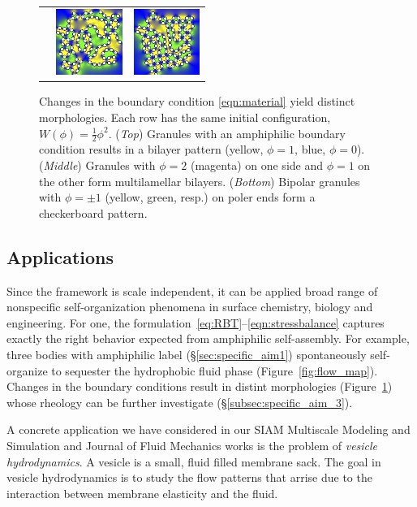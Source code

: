 \begin{figure}
\begin{center}
\begin{tabular}{m{0.9in}m{0.9in}m{0.9in}}
      &\includegraphics[width=0.85in]{figures/SpecificAim1/N100A2.jpg}
      &\includegraphics[width=0.85in]{figures/SpecificAim1/N100A3.jpg} 
  \end{tabular}
  \end{center}
  \vspace{-15pt}
  \caption{\footnotesize \label{fig:self-assembly2}
  Changes in the boundary condition \eqref{eqn:material}
  yield distinct morphologies.
  Each row has the same initial configuration, $W(\phi) = \tfrac{1}{2}\phi^2$.
  (\emph{Top}) Granules with an amphiphilic boundary condition
  results in a bilayer pattern (yellow,
  $\phi = 1$, blue, $\phi = 0$).
  (\emph{Middle}) Granules with $\phi = 2$ (magenta) on one side and $\phi = 1$
  on the other   form multilamellar bilayers.
  (\emph{Bottom}) Bipolar granules with $\phi = \pm 1$ (yellow, green, resp.)
  on poler ends   form a checkerboard pattern.}
\end{figure}
\subsection{Applications}
Since the framework is scale independent, it can be applied broad
range of nonspecific self-organization phenomena in surface chemistry,
biology and engineering. For one, the
formulation~\eqref{eq:RBT}--\eqref{eqn:stressbalance} captures exactly
the right behavior expected from amphiphilic self-assembly.
For example, three bodies with amphiphilic label (\S\ref{sec:specific_aim1})
spontaneously self-organize to sequester the hydrophobic fluid phase
(Figure~\ref{fig:flow_map}).
Changes in the boundary conditions result in
distint morphologies
(Figure~\ref{fig:self-assembly2})
whose rheology can be further investigate (\S\ref{subsec:specific_aim_3}).

A concrete application we have considered in our
SIAM Multiscale Modeling and Simulation and Journal of Fluid Mechanics works
\cite{Fu2018_SIAM, FuQuRyYo22}
is the problem of \emph{vesicle hydrodynamics}.
A vesicle is a small, fluid filled membrane sack.
The goal in vesicle hydrodynamics is to study the flow patterns 
that arrise due to the interaction
between membrane elasticity and the fluid.

